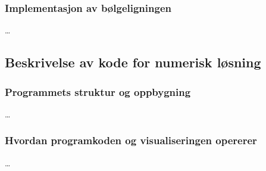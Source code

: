\subsubsection{Implementasjon av bølgeligningen}
\dots





\subsection{Beskrivelse av kode for numerisk løsning}
\subsubsection{Programmets struktur og oppbygning}
\dots

\subsubsection{Hvordan programkoden og visualiseringen opererer}
\dots

